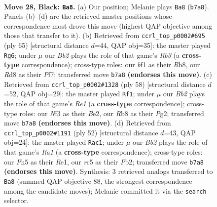 \documentclass[11pt]{article}
\begin{document}
\clearpage

\begin{figure}[p]\centering
\begin{subfigure}{0.46\textwidth}\centering
\resizebox{\linewidth}{!}{%
\newchessgame
\chessboard[
  setfen={1r1r4/pb1p1pk1/8/2R1p2p/8/5nP1/PP3P1P/2BK1B1R b - - 5 28},
  showmover=false,
  pgfstyle=straightmove, color=movearrow, markmove={b7-a8}
]}
\caption{}
\end{subfigure}\hfill
\begin{subfigure}{0.46\textwidth}\centering
\resizebox{\linewidth}{!}{%
\newchessgame
\chessboard[
  setfen={1r2k3/5pp1/pr6/4P3/1n3p2/RB1PbN1P/1P4P1/1K1R4 b - - 0 33},
  showmover=false,
  pgfstyle=straightmove, color=movearrow, markmove={b6-g6}
]}
\caption{}
\end{subfigure}
\\[4pt]
\begin{subfigure}{0.46\textwidth}\centering
\resizebox{\linewidth}{!}{%
\newchessgame
\chessboard[
  setfen={1rbr1k2/5p1p/pP2p3/n2p4/6R1/P4N2/2P1B1PP/2K1R3 w - - 4 30},
  showmover=false,
  pgfstyle=straightmove, color=movearrow, markmove={e1-f1}
]}
\caption{}
\end{subfigure}\hfill
\begin{subfigure}{0.46\textwidth}\centering
\resizebox{\linewidth}{!}{%
\newchessgame
\chessboard[
  setfen={r1b4k/p5bp/5r2/1p3pN1/3p4/6BP/PP4P1/R3R1K1 w - - 4 27},
  showmover=false,
  pgfstyle=straightmove, color=movearrow, markmove={a1-c1}
]}
\caption{}
\end{subfigure}
\caption{\textbf{Move 28, Black: \texttt{Ba8}.} (a) Our position; Melanie plays \texttt{Ba8} (\texttt{b7a8}). Panels (b)--(d) are the retrieved master positions whose correspondence most drove this move (highest QAP objective among those that transfer to it). (b) Retrieved from \texttt{ccrl\_top\_p0002\#695} (ply 65) [structural distance $d$=44, QAP obj=35]: the master played \texttt{Rg6}; under $\mu$ our \emph{Bb2} plays the role of that game's \emph{Rb3} (a \textbf{cross-type} correspondence); cross-type roles: our \emph{b}f1 as their \emph{R}b8, our \emph{R}d8 as their \emph{P}f7; transferred move \texttt{b7a8} \textbf{(endorses this move)}. (c) Retrieved from \texttt{ccrl\_top\_p0002\#1328} (ply 58) [structural distance $d$=52, QAP obj=29]: the master played \texttt{Rf1}; under $\mu$ our \emph{Bb2} plays the role of that game's \emph{Re1} (a \textbf{cross-type} correspondence); cross-type roles: our \emph{N}f3 as their \emph{B}e2, our \emph{R}b8 as their \emph{P}g2; transferred move \texttt{b7a8} \textbf{(endorses this move)}. (d) Retrieved from \texttt{ccrl\_top\_p0002\#1191} (ply 52) [structural distance $d$=43, QAP obj=24]: the master played \texttt{Rac1}; under $\mu$ our \emph{Bb2} plays the role of that game's \emph{Ra1} (a \textbf{cross-type} correspondence); cross-type roles: our \emph{P}h5 as their \emph{R}e1, our \emph{r}c5 as their \emph{P}b2; transferred move \texttt{b7a8} \textbf{(endorses this move)}. Synthesis: 3 retrieved analogs transferred to \texttt{Ba8} (summed QAP objective 88, the strongest correspondence among the candidate moves); Melanie committed it via the \texttt{search} selector.}
\label{fig:thought-m55}
\end{figure}
\end{document}
